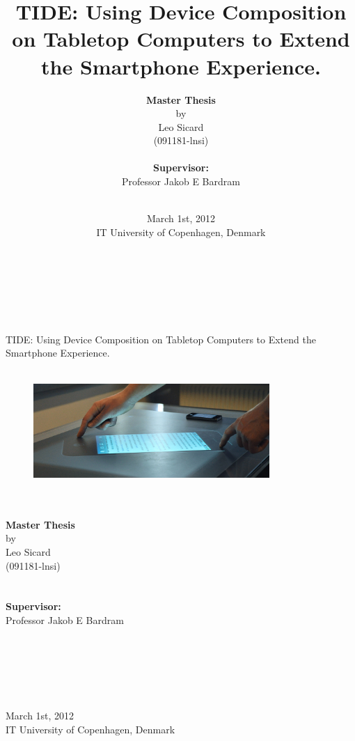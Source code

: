 \documentclass[a4paper,11pt,twoside,onecolumn,openright]{memoir}
\title{\Huge TIDE: Using Device Composition on Tabletop Computers to Extend the Smartphone Experience.}
\author{\textbf{Master Thesis}\\by\\Leo Sicard\\(091181-lnsi)\\
\\
\textbf{Supervisor:}\\Professor Jakob E Bardram\\
\\}
\date{March 1st, 2012\\IT University of Copenhagen, Denmark}
\begin{document}

\pagestyle{empty}

\begin{centering}
\hfill\\
\hfill\\
\hfill\\
\hfill\\

\Huge TIDE: Using Device Composition on Tabletop Computers to Extend the Smartphone Experience.
\hfill\\
\hfill\\
\begin{figure}[h!]
  \centering
    \includegraphics[width=0.8\textwidth]{images/tide314}
\end{figure}
\large
\hfill\\
\hfill\\
\textbf{Master Thesis}\\by\\Leo Sicard\\(091181-lnsi)\\
\hfill\\
\hfill\\
\textbf{Supervisor:}\\Professor Jakob E Bardram\\
\hfill\\
\hfill\\
\hfill\\
\hfill\\
\hfill\\
\hfill\\
March 1st, 2012\\IT University of Copenhagen, Denmark\\
\end{centering}
\clearpage
\end{document}
